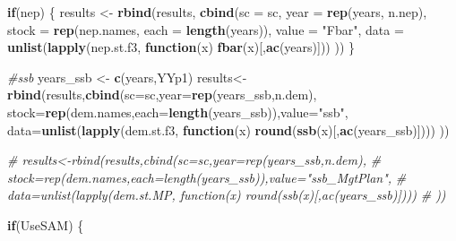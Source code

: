 \documentclass[
]{article}
\newenvironment{Shaded}{\begin{snugshade}}{\end{snugshade}}
\newcommand{\CommentTok}[1]{\textcolor[rgb]{0.56,0.35,0.01}{\textit{#1}}}
\newcommand{\ControlFlowTok}[1]{\textcolor[rgb]{0.13,0.29,0.53}{\textbf{#1}}}
\newcommand{\DataTypeTok}[1]{\textcolor[rgb]{0.13,0.29,0.53}{#1}}
\newcommand{\KeywordTok}[1]{\textcolor[rgb]{0.13,0.29,0.53}{\textbf{#1}}}
\newcommand{\NormalTok}[1]{#1}
\newcommand{\StringTok}[1]{\textcolor[rgb]{0.31,0.60,0.02}{#1}}
\begin{document}
\begin{Shaded}
\begin{Highlighting}[]
{{{{{    \ControlFlowTok{if}\NormalTok{(nep) \{}
\NormalTok{     results <-}\StringTok{ }\KeywordTok{rbind}\NormalTok{(results, }\KeywordTok{cbind}\NormalTok{(}\DataTypeTok{sc =}\NormalTok{ sc, }\DataTypeTok{year =} \KeywordTok{rep}\NormalTok{(years, n.nep),}
                    \DataTypeTok{stock =} \KeywordTok{rep}\NormalTok{(nep.names, }\DataTypeTok{each =} \KeywordTok{length}\NormalTok{(years)), }\DataTypeTok{value =} \StringTok{"Fbar"}\NormalTok{,}
                    \DataTypeTok{data =} \KeywordTok{unlist}\NormalTok{(}\KeywordTok{lapply}\NormalTok{(nep.st.f3, }\ControlFlowTok{function}\NormalTok{(x) }\KeywordTok{fbar}\NormalTok{(x)[,}\KeywordTok{ac}\NormalTok{(years)]))}
\NormalTok{                    ))}
\NormalTok{    \}}

    \CommentTok{#ssb}
\NormalTok{    years_ssb <-}\StringTok{ }\KeywordTok{c}\NormalTok{(years,YYp1)}
\NormalTok{    results<-}\KeywordTok{rbind}\NormalTok{(results,}\KeywordTok{cbind}\NormalTok{(}\DataTypeTok{sc=}\NormalTok{sc,}\DataTypeTok{year=}\KeywordTok{rep}\NormalTok{(years_ssb,n.dem),}
                                 \DataTypeTok{stock=}\KeywordTok{rep}\NormalTok{(dem.names,}\DataTypeTok{each=}\KeywordTok{length}\NormalTok{(years_ssb)),}\DataTypeTok{value=}\StringTok{"ssb"}\NormalTok{,}
                                 \DataTypeTok{data=}\KeywordTok{unlist}\NormalTok{(}\KeywordTok{lapply}\NormalTok{(dem.st.f3, }\ControlFlowTok{function}\NormalTok{(x) }\KeywordTok{round}\NormalTok{(}\KeywordTok{ssb}\NormalTok{(x)[,}\KeywordTok{ac}\NormalTok{(years_ssb)])))}
\NormalTok{    ))}

\CommentTok{#    results<-rbind(results,cbind(sc=sc,year=rep(years_ssb,n.dem),}
 \CommentTok{#                                stock=rep(dem.names,each=length(years_ssb)),value="ssb_MgtPlan",}
  \CommentTok{#                               data=unlist(lapply(dem.st.MP, function(x) round(ssb(x)[,ac(years_ssb)])))}
   \CommentTok{# ))}

    \ControlFlowTok{if}\NormalTok{(UseSAM) \{}
    
}}}}}
\end{Highlighting}
\end{Shaded}
\end{document}
